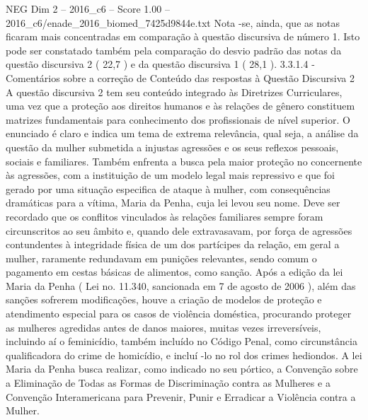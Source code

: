 \begin{textsample}{NEG Dim 2 – 2016\_c6 – Score 1.00 – 2016\_c6/enade\_2016\_biomed\_7425d9844e.txt}
Nota -se, ainda, que as notas ficaram mais concentradas em comparação à questão discursiva de número 1.
Isto pode ser constatado também pela comparação do desvio padrão das notas da questão discursiva 2 ( 22,7 ) e da questão discursiva 1 ( 28,1 ). 3.3.1.4 - Comentários sobre a correção de Conteúdo das respostas à Questão Discursiva 2 A questão discursiva 2 tem seu conteúdo integrado às Diretrizes Curriculares, uma vez que a proteção aos direitos humanos e às relações de gênero constituem matrizes fundamentais para conhecimento dos profissionais de nível superior.
O enunciado é claro e indica um tema de extrema relevância, qual seja, a análise da questão da mulher submetida a injustas agressões e os seus reflexos pessoais, sociais e familiares.
Também enfrenta a busca pela maior proteção no concernente às agressões, com a instituição de um modelo legal mais repressivo e que foi gerado por uma situação especifica de ataque à mulher, com consequências dramáticas para a vítima, Maria da Penha, cuja lei levou seu nome.
Deve ser recordado que os conflitos vinculados às relações familiares sempre foram circunscritos ao seu âmbito e, quando dele extravasavam, por força de agressões contundentes à integridade física de um dos partícipes da relação, em geral a mulher, raramente redundavam em punições relevantes, sendo comum o pagamento em cestas básicas de alimentos, como sanção.
Após a edição da lei Maria da Penha ( Lei no. 11.340, sancionada em 7 de agosto de 2006 ), além das sanções sofrerem modificações, houve a criação de modelos de proteção e atendimento especial para os casos de violência doméstica, procurando proteger as mulheres agredidas antes de danos maiores, muitas vezes irreversíveis, incluindo aí o feminicídio, também incluído no Código Penal, como circunstância qualificadora do crime de homicídio, e incluí -lo no rol dos crimes hediondos.
A lei Maria da Penha busca realizar, como indicado no seu pórtico, a Convenção sobre a Eliminação de Todas as Formas de Discriminação contra as Mulheres e a Convenção Interamericana para Prevenir, Punir e Erradicar a Violência contra a Mulher.

\end{textsample}
